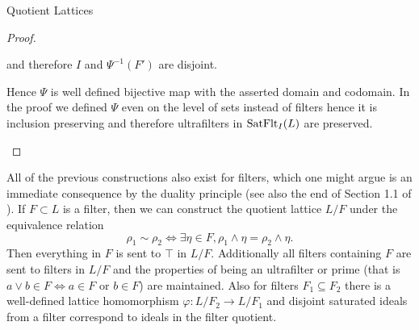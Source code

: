 \begin{subsection}{Quotient Lattices}
\begin{proof}
\begin{itemize}
\begin{itemize}
                        and therefore \( I \) and \( \Psi^{-1}(F') \) are disjoint.
                \end{itemize}
        Hence \( \Psi \) is well defined bijective map with the asserted domain and codomain.
        In the proof we defined \( \Psi \) even on the level of sets instead of filters hence it
        is inclusion preserving and therefore ultrafilters in \( \textnormal{SatFlt}_{I}({L}) \) are preserved.
        \end{itemize}
    \end{proof}
    \begin{remark} \label{dualfilterquotient}
        All of the previous constructions also exist for filters, which one might argue is an immediate consequence by
        the duality principle (see also the end of Section 1.1 of \cite{genlattheorygraetzer}). 
        If \( F \subset L \) is a filter, then 
        we can construct the quotient lattice \( L / F \) under the equivalence relation 
        \[
            \rho_1 \sim \rho_2 \iff \exists \eta \in F, \rho_1 \wedge \eta = \rho_2 \wedge \eta.
        \]
        Then everything in \( F \) is sent to \( \top \) in \( L / F \). Additionally all filters
        containing \( F \) are sent to filters in \( L / F \) and the properties of being an ultrafilter
        or prime (that is \( a \vee b \in F \iff a \in F \text{ or } b \in F \)) are maintained. 
        Also for filters \( F_1 \subseteq F_2 \) there is a well-defined lattice homomorphism \( \varphi : L / F_2 \to L / F_1 \)
        and disjoint saturated ideals from a filter correspond to ideals in the filter quotient.
    \end{remark}
\end{subsection}
